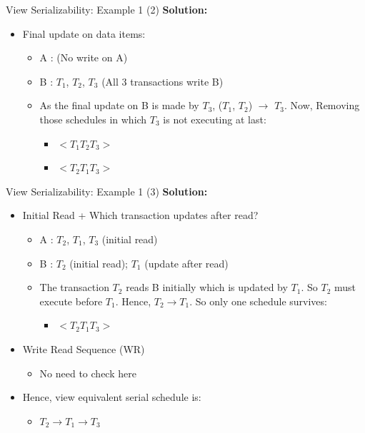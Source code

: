 \documentclass[aspectratio=169, xcolor=dvipsnames]{beamer}
\begin{document}
\begin{frame}{View Serializability: Example 1 (2)}
    \textbf{Solution:}
    \begin{itemize}[<+->]
        \item Final update on data items:
        \begin{itemize}
            \item[$\triangleright$] A : (No write on A)
            \item[$\triangleright$] B : $T_1$, $T_2$, $T_3$ (All 3 transactions write B)
            \item[$\triangleright$] As the final update on B is made by $T_3$, ($T_1$, $T_2$) $\rightarrow$ $T_3$. Now, Removing those schedules in which $T_3$ is not executing at last:
            \begin{itemize}
                \item $< T_1 T_2 T_3 >$
                \item $< T_2 T_1 T_3 >$
            \end{itemize}
        \end{itemize}
    \end{itemize}
\end{frame}

\begin{frame}{View Serializability: Example 1 (3)}
    \textbf{Solution:}
    \begin{itemize}[<+->]
        \item Initial Read + Which transaction updates after read?
        \begin{itemize}
            \item[$\triangleright$] A : $T_2$, $T_1$, $T_3$ (initial read)
            \item[$\triangleright$] B : $T_2$ (initial read); $T_1$ (update after read)
            \item[$\triangleright$] The transaction $T_2$ reads B initially which is updated by $T_1$. So $T_2$ must execute before $T_1$. Hence, $T_2 \rightarrow T_1$. So only one schedule survives:
            \begin{itemize}
                \item $< T_2 T_1 T_3 >$
            \end{itemize}
        \end{itemize}
        \item Write Read Sequence (WR)
        \begin{itemize}
            \item[$\triangleright$] No need to check here
        \end{itemize}
        \item Hence, view equivalent serial schedule is:
        \begin{itemize}
            \item[$\triangleright$] $T_2 \rightarrow T_1 \rightarrow T_3$
        \end{itemize}
    \end{itemize}
\end{frame}
\end{document}
